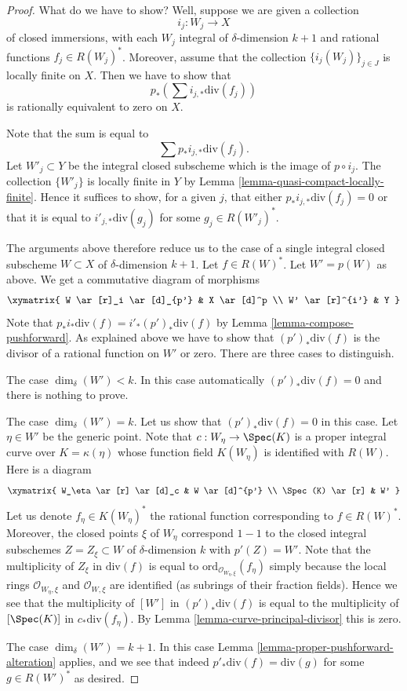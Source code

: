 \begin{proof}
What do we have to show? Well, suppose we are given a collection
$$
i_j : W_j \longrightarrow X
$$
of closed immersions, with each $W_j$ integral of $\delta$-dimension $k + 1$
and rational functions $f_j \in R(W_j)^*$.
Moreover, assume that
the collection $\{i_j(W_j)\}_{j \in J}$ is locally finite on $X$.
Then we have to show that
$$
p_*\left(\sum i_{j, *}\text{div}(f_j)\right)
$$
is rationally equivalent to zero on $X$.

\medskip\noindent
Note that the sum is equal to
$$
\sum p_*i_{j, *}\text{div}(f_j).
$$
Let $W'_j \subset Y$ be the integral closed subscheme which is the
image of $p \circ i_j$. The collection $\{W'_j\}$ is locally finite
in $Y$ by Lemma \ref{lemma-quasi-compact-locally-finite}.
Hence it suffices to show, for a given $j$, that either
$p_*i_{j, *}\text{div}(f_j) = 0$ or that it
is equal to $i'_{j, *}\text{div}(g_j)$ for some $g_j \in R(W'_j)^*$.

\medskip\noindent
The arguments above therefore reduce us to the case of a single
integral closed subscheme $W \subset X$ of $\delta$-dimension $k + 1$.
Let $f \in R(W)^*$. Let $W' = p(W)$ as above.
We get a commutative diagram of morphisms
$$
\xymatrix{
W \ar[r]_i \ar[d]_{p'} & X \ar[d]^p \\
W' \ar[r]^{i'} & Y
}
$$
Note that $p_*i_*\text{div}(f) = i'_*(p')_*\text{div}(f)$ by
Lemma \ref{lemma-compose-pushforward}. As explained above
we have to show that $(p')_*\text{div}(f)$
is the divisor of a rational function on $W'$ or zero.
There are three cases to distinguish.

\medskip\noindent
The case $\dim_\delta(W') < k$. In this case automatically
$(p')_*\text{div}(f) = 0$ and there is nothing to prove.

\medskip\noindent
The case $\dim_\delta(W') = k$. Let us show that $(p')_*\text{div}(f) = 0$
in this case. Let $\eta \in W'$ be the generic point.
Note that $c : W_\eta \to \Spec(K)$
is a proper integral curve over $K = \kappa(\eta)$
whose function field $K(W_\eta)$ is identified with $R(W)$.
Here is a diagram
$$
\xymatrix{
W_\eta \ar[r] \ar[d]_c & W \ar[d]^{p'} \\
\Spec(K) \ar[r] & W'
}
$$
Let us denote $f_\eta \in K(W_\eta)^*$ the rational function
corresponding to $f \in R(W)^*$.
Moreover, the closed points $\xi$ of $W_\eta$ correspond $1 - 1$ to the
closed integral subschemes $Z = Z_\xi \subset W$ of $\delta$-dimension $k$
with $p'(Z) = W'$. Note that the multiplicity
of $Z_\xi$ in $\text{div}(f)$ is equal to
$\text{ord}_{\mathcal{O}_{W_\eta, \xi}}(f_\eta)$ simply because the
local rings $\mathcal{O}_{W_\eta, \xi}$ and $\mathcal{O}_{W, \xi}$
are identified (as subrings of their fraction fields).
Hence we see that the multiplicity of $[W']$ in
$(p')_*\text{div}(f)$ is equal to the multiplicity of
$[\Spec(K)]$ in $c_*\text{div}(f_\eta)$.
By Lemma \ref{lemma-curve-principal-divisor} this is zero.

\medskip\noindent
The case $\dim_\delta(W') = k + 1$. In this case
Lemma \ref{lemma-proper-pushforward-alteration} applies,
and we see that indeed $p'_*\text{div}(f) = \text{div}(g)$
for some $g \in R(W')^*$ as desired.
\end{proof}
